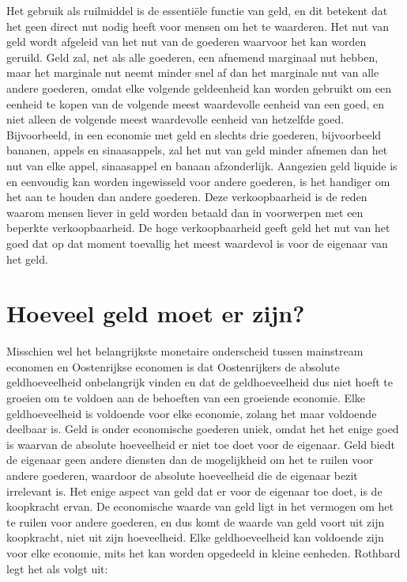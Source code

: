 Het gebruik als ruilmiddel is de essentiële functie van geld, en dit betekent dat het geen direct nut nodig heeft voor mensen om het te waarderen. Het nut van geld wordt afgeleid van het nut van de goederen waarvoor het kan worden geruild. Geld zal, net als alle goederen, een afnemend marginaal nut hebben, maar het marginale nut neemt minder snel af dan het marginale nut van alle andere goederen, omdat elke volgende geldeenheid kan worden gebruikt om een eenheid te kopen van de volgende meest waardevolle eenheid van een goed, en niet alleen de volgende meest waardevolle eenheid van hetzelfde goed. Bijvoorbeeld, in een economie met geld en slechts drie goederen, bijvoorbeeld bananen, appels en sinaasappels, zal het nut van geld minder afnemen dan het nut van elke appel, sinaasappel en banaan afzonderlijk. Aangezien geld liquide is en eenvoudig kan worden ingewisseld voor andere goederen, is het handiger om het aan te houden dan andere goederen. Deze verkoopbaarheid is de reden waarom mensen liever in geld worden betaald dan in voorwerpen met een beperkte verkoopbaarheid. De hoge verkoopbaarheid geeft geld het nut van het goed dat op dat moment toevallig het meest waardevol is voor de eigenaar van het geld.

\vspace{-0.5em}
\hypertarget{hoeveel-geld-moet-er-zijn}{%
\section{Hoeveel geld moet er zijn?}\label{hoeveel-geld-moet-er-zijn}}

Misschien wel het belangrijkste monetaire onderscheid tussen mainstream economen en Oostenrijkse economen is dat Oostenrijkers de absolute geldhoeveelheid onbelangrijk vinden en dat de geldhoeveelheid dus niet hoeft te groeien om te voldoen aan de behoeften van een groeiende economie. Elke geldhoeveelheid is voldoende voor elke economie, zolang het maar voldoende deelbaar is. Geld is onder economische goederen uniek, omdat het het enige goed is waarvan de absolute hoeveelheid er niet toe doet voor de eigenaar. Geld biedt de eigenaar geen andere diensten dan de mogelijkheid om het te ruilen voor andere goederen, waardoor de absolute hoeveelheid die de eigenaar bezit irrelevant is. Het enige aspect van geld dat er voor de eigenaar toe doet, is de koopkracht ervan. De economische waarde van geld ligt in het vermogen om het te ruilen voor andere goederen, en dus komt de waarde van geld voort uit zijn koopkracht, niet uit zijn hoeveelheid. Elke geldhoeveelheid kan voldoende zijn voor elke economie, mits het kan worden opgedeeld in kleine eenheden. Rothbard legt het als volgt uit:

